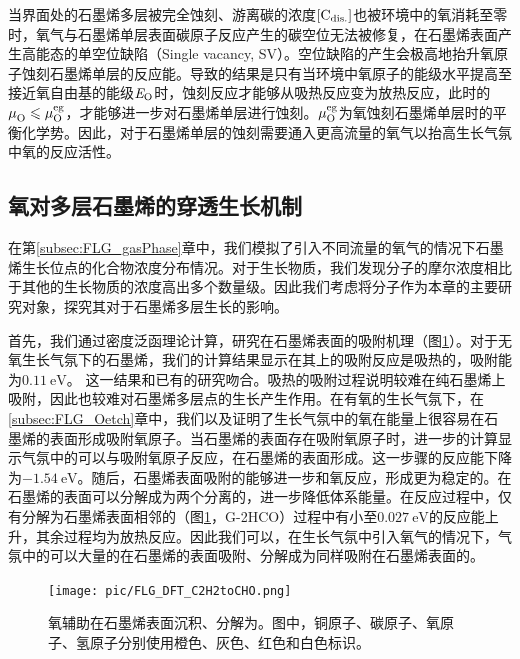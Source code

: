 当界面处的石墨烯多层被完全蚀刻、游离碳的浓度$\rm{\left[C_{dis.}\right]} \it$也被环境中的氧消耗至零时，氧气与石墨烯单层表面碳原子反应产生的碳空位无法被修复，在石墨烯表面产生高能态的单空位缺陷（Single vacancy, SV）。空位缺陷的产生会极高地抬升氧原子蚀刻石墨烯单层的反应能。导致的结果是只有当环境中氧原子的能级水平提高至接近氧自由基的能级$\it E_{\rm O} \it$时，蚀刻反应才能够从吸热反应变为放热反应，此时的$\it \mu_{\rm O}^{\rm } \it \leqslant  \it \mu_{\rm O}^{\rm eg} \it  $，才能够进一步对石墨烯单层进行蚀刻。$\it \mu_{\rm O}^{\rm eg} \it$为氧蚀刻石墨烯单层时的平衡化学势。因此，对于石墨烯单层的蚀刻需要通入更高流量的氧气以抬高生长气氛中氧的反应活性。

\subsection{氧对多层石墨烯的穿透生长机制}
\label{subsec:Opene}
在第\ref{subsec:FLG_gasPhase}章中，我们模拟了引入不同流量的氧气的情况下石墨烯生长位点的化合物浓度分布情况。对于生长物质，我们发现分子的摩尔浓度相比于其他的生长物质的浓度高出多个数量级。因此我们考虑将分子作为本章的主要研究对象，探究其对于石墨烯多层生长的影响。

首先，我们通过密度泛函理论计算，研究在石墨烯表面的吸附机理（图\ref{fig:FLG_DFT_C2H2toCHO}）。对于无氧生长气氛下的石墨烯，我们的计算结果显示在其上的吸附反应是吸热的，吸附能为$\SI{0.11}{\electronvolt}$。
这一结果和已有的研究吻合。吸热的吸附过程说明较难在纯石墨烯上吸附，因此也较难对石墨烯多层点的生长产生作用。在有氧的生长气氛下，在\ref{subsec:FLG_Oetch}章中，我们以及证明了生长气氛中的氧在能量上很容易在石墨烯的表面形成吸附氧原子。当石墨烯的表面存在吸附氧原子时，进一步的计算显示气氛中的可以与吸附氧原子反应，在石墨烯的表面形成。这一步骤的反应能下降为$\SI{-1.54}{\electronvolt}$。随后，石墨烯表面吸附的能够进一步和氧反应，形成更为稳定的。在石墨烯的表面可以分解成为两个分离的，进一步降低体系能量。在反应过程中，仅有分解为石墨烯表面相邻的（图\ref{fig:FLG_DFT_C2H2toCHO}，G-2HCO）过程中有小至$\SI{0.027}{\electronvolt}$的反应能上升，其余过程均为放热反应。因此我们可以，在生长气氛中引入氧气的情况下，气氛中的可以大量的在石墨烯的表面吸附、分解成为同样吸附在石墨烯表面的。

\begin{figure}[htb]
    \texttt{[image: pic/FLG\_DFT\_C2H2toCHO.png]}
    \caption{氧辅助在石墨烯表面沉积、分解为。图中，铜原子、碳原子、氧原子、氢原子分别使用橙色、灰色、红色和白色标识。}
    \label{fig:FLG_DFT_C2H2toCHO}
\end{figure}

